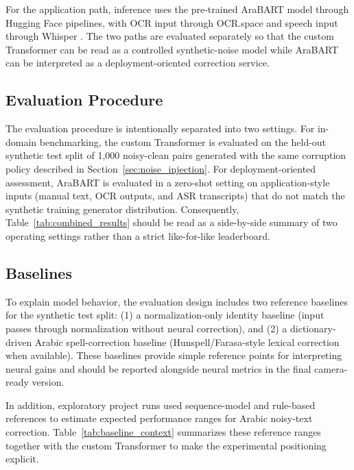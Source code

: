 \documentclass[conference]{IEEEtran}
\begin{document}
For the application path, inference uses the pre-trained AraBART model through Hugging Face pipelines, with OCR input through OCR.space and speech input through Whisper \cite{camel_arabart,ocrspace,radford2023whisper}. The two paths are evaluated separately so that the custom Transformer can be read as a controlled synthetic-noise model while AraBART can be interpreted as a deployment-oriented correction service.

\subsection{Evaluation Procedure}
The evaluation procedure is intentionally separated into two settings. For in-domain benchmarking, the custom Transformer is evaluated on the held-out synthetic test split of 1{,}000 noisy-clean pairs generated with the same corruption policy described in Section~\ref{sec:noise_injection}. For deployment-oriented assessment, AraBART is evaluated in a zero-shot setting on application-style inputs (manual text, OCR outputs, and ASR transcripts) that do not match the synthetic training generator distribution. Consequently, Table~\ref{tab:combined_results} should be read as a side-by-side summary of two operating settings rather than a strict like-for-like leaderboard.

\subsection{Baselines}
To explain model behavior, the evaluation design includes two reference baselines for the synthetic test split: (1) a normalization-only identity baseline (input passes through normalization without neural correction), and (2) a dictionary-driven Arabic spell-correction baseline (Hunspell/Farasa-style lexical correction when available). These baselines provide simple reference points for interpreting neural gains and should be reported alongside neural metrics in the final camera-ready version.

In addition, exploratory project runs used sequence-model and rule-based references to estimate expected performance ranges for Arabic noisy-text correction. Table~\ref{tab:baseline_context} summarizes these reference ranges together with the custom Transformer to make the experimental positioning explicit.
\end{document}
